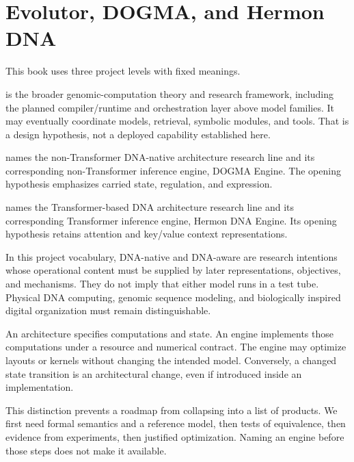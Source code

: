 \section{Evolutor, DOGMA, and Hermon DNA}\label{sec:taxonomy}
This book uses three project levels with fixed meanings.

 is the broader genomic-computation theory and research framework, including the planned compiler/runtime and orchestration layer above model families. It may eventually coordinate models, retrieval, symbolic modules, and tools. That is a design hypothesis, not a deployed capability established here.

 names the non-Transformer DNA-native architecture research line and its corresponding non-Transformer inference engine, DOGMA Engine. The opening hypothesis emphasizes carried state, regulation, and expression.

 names the Transformer-based DNA architecture research line and its corresponding Transformer inference engine, Hermon DNA Engine. Its opening hypothesis retains attention and key/value context representations.


In this project vocabulary, DNA-native and DNA-aware are research intentions whose operational content must be supplied by later representations, objectives, and mechanisms. They do not imply that either model runs in a test tube. Physical DNA computing, genomic sequence modeling, and biologically inspired digital organization must remain distinguishable.

An architecture specifies computations and state. An engine implements those computations under a resource and numerical contract. The engine may optimize layouts or kernels without changing the intended model. Conversely, a changed state transition is an architectural change, even if introduced inside an implementation.

This distinction prevents a roadmap from collapsing into a list of products. We first need formal semantics and a reference model, then tests of equivalence, then evidence from experiments, then justified optimization. Naming an engine before those steps does not make it available.

